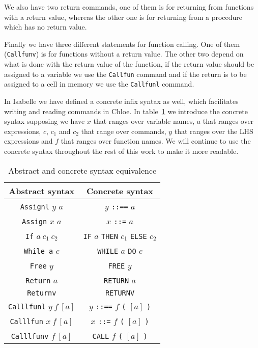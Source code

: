 We also have two return commands, one of them is for returning from functions with a return value, whereas the other one is for returning from a procedure which has no return value.

Finally we have three different statements for function calling.
One of them (\verb|Callfunv|) is for functions without a return value.
The other two depend on what is done with the return value of the function, if the return value should be assigned to a variable we use the \verb|Callfun| command and if the return is to be assigned to a cell in memory we use the \verb|Callfunl| command.

In Isabelle we have defined a concrete infix syntax as well, which facilitates writing and reading commands in Chloe.
In table~\ref{tab:concrete_syntax} we introduce the concrete syntax supposing we have $x$ that ranges over variable names, $a$ that ranges over expressions, $c$, $c_{1}$ and $c_{2}$ that range over commands, $y$ that ranges over the LHS expressions and $f$ that ranges over function names.
We will continue to use the concrete syntax throughout the rest of this work to make it more readable.

\begin{table}[h!]
\centering
\begin{tabular}{|c|c|}
  \hline
  \textbf{Abstract syntax} & \textbf{Concrete syntax} \\ [0.5ex]
  \hline \hline
  \verb|Assignl| $y$ $a$ & $y$ \verb|::==| $a$ \\
  \verb|Assign| $x$ $a$ & $x$ \verb|::=| $a$ \\
  \verb|If| $a\ c_{1}\ c_{2}$ & \verb|IF| $a$ \verb|THEN| $c_{1}$ \verb|ELSE| $c_{2}$ \\
  \verb|While a| $c$ & \verb|WHILE| $a$ \verb|DO| $c$ \\
  \verb|Free| $y$ & \verb|FREE| $y$ \\
  \verb|Return| $a$ & \verb|RETURN| $a$ \\
  \verb|Returnv| & \verb|RETURNV| \\
  \verb|Calllfunl| $y\ f\ [a]$ & $y$ \verb|::==| $f$ \verb|(| $[a]$ \verb|)| \\
  \verb|Calllfun| $x\ f\ [a]$ & $x$ \verb|::=| $f$ \verb|(| $[a]$ \verb|)| \\
  \verb|Calllfunv| $f\ [a]$ & \verb|CALL| $f$ \verb|(| $[a]$ \verb|)| \\
  \hline
\end{tabular}

\caption{Abstract and concrete syntax equivalence}
\label{tab:concrete_syntax}
\end{table}


